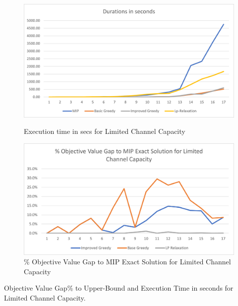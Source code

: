 \documentclass[11pt]{article}
\begin{document}
        \begin{figure}[htb!]
        \centering
        \begin{minipage}{.6\textwidth}
            \centering
            \includegraphics[width=.7\linewidth]{durations_exact_limited_17.png}
            \caption{Execution time in secs for Limited Channel Capacity}
            \label{fig:fig_durations_exact_limited_17}
        \end{minipage}%
        \begin{minipage}{.6\textwidth}
            \centering
            \includegraphics[width=.7\linewidth]{performance_exact_limited_17.png}
            \caption{\% Objective Value Gap to MIP Exact Solution for Limited Channel Capacity}
            \label{fig:fig_value_gap_exact_limited_17}
        \end{minipage}
        \end{figure}


        \begin{table}[htb!]
        \caption{Objective Value Gap\% to Upper-Bound and Execution Time in seconds for Limited Channel Capacity.}\label{table:tbl_ub_limited_results}
        \begin{adjustbox}{max width=1\textwidth}
        \end{adjustbox}
        \label{tab:test}
        \end{table}
\end{document}
